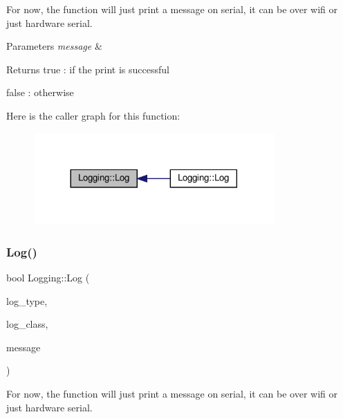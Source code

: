 For now, the function will just print a message on serial, it can be over wifi or just hardware serial. 


\begin{DoxyParams}{Parameters}
{\em message} & \\
\hline
\end{DoxyParams}
\begin{DoxyReturn}{Returns}
true \+: if the print is successful 

false \+: otherwise 
\end{DoxyReturn}
Here is the caller graph for this function\+:
\nopagebreak
\begin{figure}[H]
\begin{center}
\leavevmode
\includegraphics[width=260pt]{classLogging_abefeba86ea7c9ec93b7de22fc03a558e_icgraph}
\end{center}
\end{figure}
\mbox{\label{classLogging_a7ad9e952d45e4b456006755beb62e9d3}} 
\subsubsection{\texorpdfstring{Log()}{Log()}\hspace{0.1cm}{\footnotesize\ttfamily [2/2]}}
{\footnotesize\ttfamily bool Logging\+::\+Log (\begin{DoxyParamCaption}\item[{\hyperlink{namespaceCONFIG__SET_aaf9764960ee214f0eaabd2461e30e932}{C\+O\+N\+F\+I\+G\+\_\+\+S\+E\+T\+::\+L\+O\+G\+\_\+\+T\+Y\+PE}}]{log\+\_\+type,  }\item[{\hyperlink{namespaceCONFIG__SET_a3c4daebec2ea4e9f6affb5b3abbeb863}{C\+O\+N\+F\+I\+G\+\_\+\+S\+E\+T\+::\+L\+O\+G\+\_\+\+C\+L\+A\+SS}}]{log\+\_\+class,  }\item[{String}]{message }\end{DoxyParamCaption})}



For now, the function will just print a message on serial, it can be over wifi or just hardware serial. 


